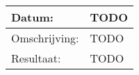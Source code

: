 \begin{tabularx}{\textwidth}{| l | X |}
  \hline
  Datum: & TODO\\
  \hline
  Omschrijving: & TODO\\
  \hline
  Resultaat: & TODO\\
  \hline
\end{tabularx}